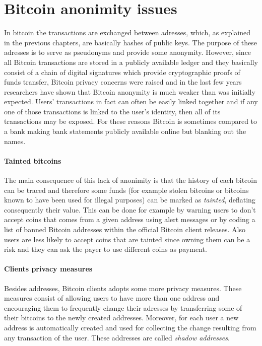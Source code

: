\section{Bitcoin anonimity issues} In bitcoin the transactions are exchanged
between adresses, which, as explained in  the previous chapters, are basically
hashes of public keys. The purpose of these adresses is to serve as pseudonyms
and provide some anonymity. However, since all Bitcoin transactions are stored
in a publicly available ledger and they basically consist of a chain of
digital signatures which provide cryptographic proofs of funds transfer, Bitcoin
privacy concerns were raised and in the last few years researchers have shown
that Bitcoin anonymity is much weaker than was initially expected. Users’
transactions in fact can often be easily linked together and if any one of those
transactions is linked to the user’s identity, then all of its transactions may
be exposed. For these reasons Bitcoin is sometimes compared to a bank making
bank statements publicly available online but blanking out the names.

\paragraph{Tainted bitcoins} The main consequence of this lack of anonimity is
that the history of each bitcoin can be traced and therefore some funds (for example
stolen bitcoins or bitcoins known to have been used for illegal purposes) can be
marked as \emph{tainted}, deflating consequently their value.  This can be done
for example by warning users to don't accept coins that comes from a given
address using alert messages or by coding a list of banned Bitcoin addresses
within the official Bitcoin client releases. Also users are less likely to
accept coins that are tainted since owning them  can be a risk and they can ask
the payer to use different coins as payment.


\paragraph{Clients privacy measures} Besides addresses, Bitcoin clients
adopts some more privacy measures. These measures consist of allowing users to
have more than one address and encouraging them to frequently change their
adresses by transferring some of their bitcoins to the newly created addresses.
Moreover, for each user a new address is automatically created and used for
collecting the change resulting from any transaction of the user. These
addresses are called \emph{shadow addresses}.







